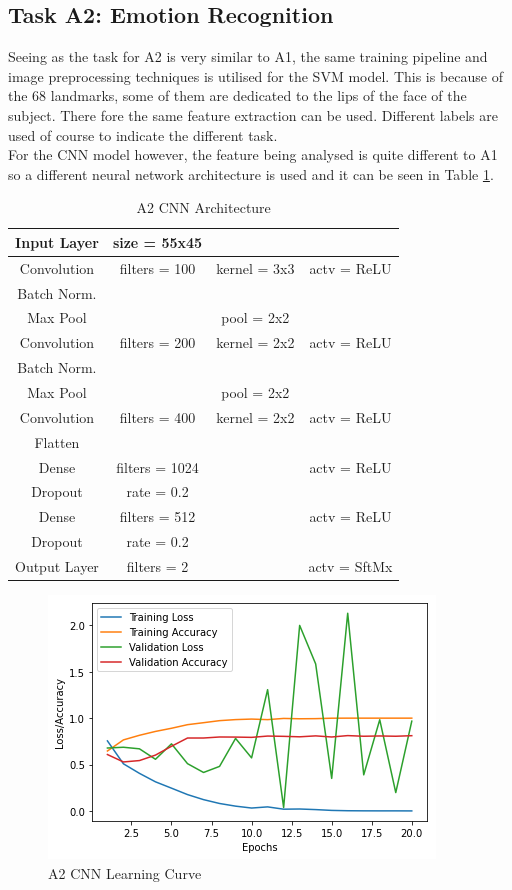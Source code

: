 \documentclass{article}
\begin{document}
    \subsection{Task A2: Emotion Recognition}
    Seeing as the task for A2 is very similar to A1, the same training pipeline and image preprocessing techniques is utilised for the SVM model. This is because of the 68 landmarks, some of them are dedicated to the lips of the face of the subject. There fore the same feature extraction can be used. Different labels are used of course to indicate the different task.\\
    
    For the CNN model however, the feature being analysed is quite different to A1 so a different neural network architecture is used and it can be seen in Table \ref{table:A2_Arch}.
 	\begin{table}[]
	\begin{tabular}{|c|c c c|}
		\hline
		Input Layer & size = 55x45 	&				&	\\
		\hline
		Convolution & filters = 100 & kernel = 3x3 	& actv = ReLU\\
		\hline
		Batch Norm. & 				&				&\\
		\hline
		Max Pool	&				& pool = 2x2  	& \\
		\hline
		Convolution & filters = 200 & kernel = 2x2 	& actv = ReLU\\
		\hline
		Batch Norm. &				&				&\\
		\hline
		Max Pool	&				& pool = 2x2  	& \\
		\hline
		Convolution & filters = 400 & kernel = 2x2	& actv = ReLU\\
		\hline
		Flatten 	& 				& 				&\\
		\hline
		Dense 		&filters = 1024 &				& actv = ReLU\\
		\hline
		Dropout 	& rate = 0.2 	&	 			&\\
		\hline
		Dense 		& filters = 512 &				& actv = ReLU\\
		\hline
		Dropout 	& rate = 0.2 	& 				&\\
		\hline
		Output Layer& filters = 2 	&				&actv = SftMx\\
		\hline
	\end{tabular}
	\caption{A2 CNN Architecture}
	\label{table:A2_Arch}
	\end{table}
    \begin{figure}[htb]
    	\centering
    	\includegraphics[scale=0.7]{Figures/A2_CNN_Graph.PNG}
    	\caption{A2 CNN Learning Curve}
    	\label{fig:A2_curve}
    \end{figure} 
\end{document}
